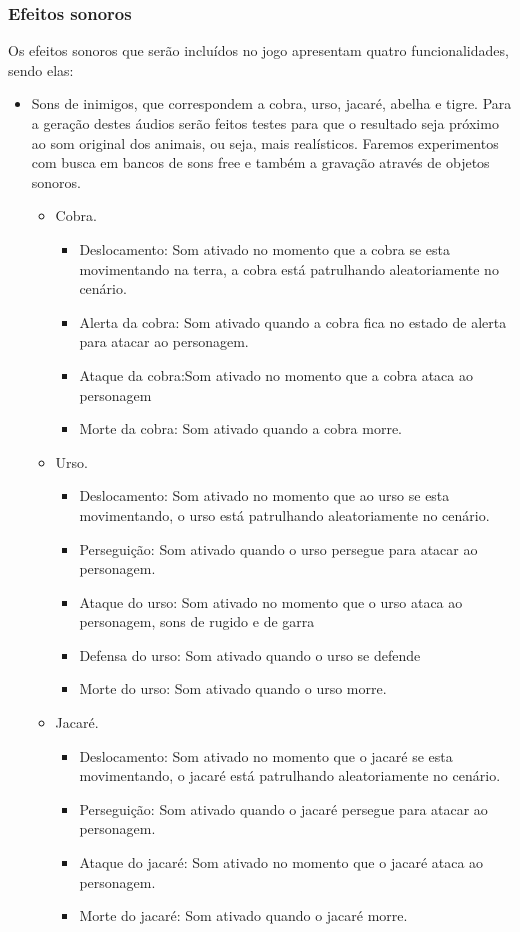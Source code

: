 \subsubsection{Efeitos sonoros}
Os efeitos sonoros que serão incluídos no jogo apresentam quatro
 funcionalidades, sendo elas:
\begin{itemize}
\item Sons de inimigos, que correspondem a cobra, urso, jacaré, abelha e tigre. 
Para a geração destes áudios serão feitos testes para que o resultado 
seja próximo ao som original dos animais, ou seja, mais realísticos. 
Faremos experimentos com busca em bancos de sons free e também a 
gravação através de objetos sonoros. 

\begin{itemize}
\item Cobra.
\begin{itemize}
\item Deslocamento: Som ativado no momento que a cobra se esta 
movimentando na terra, a cobra está patrulhando aleatoriamente no cenário.
\item Alerta da cobra: Som ativado quando a cobra fica no estado de alerta 
para atacar ao personagem.
\item Ataque da cobra:Som ativado no momento que a cobra ataca 
ao personagem 
\item Morte da cobra: Som ativado quando a cobra morre. 
\end{itemize}

\item Urso.
\begin{itemize}
\item Deslocamento: Som ativado no momento que ao urso se esta movimentando, 
o urso está patrulhando aleatoriamente no cenário.
\item Perseguição: Som ativado quando o urso persegue para atacar ao personagem.
\item Ataque do urso: Som ativado no momento que o urso ataca ao personagem, 
sons de rugido e de garra
\item Defensa do urso: Som ativado quando o urso se defende  
\item Morte do urso: Som ativado quando o urso morre.
\end{itemize}

\item Jacaré.
\begin{itemize}
\item Deslocamento: Som ativado no momento que o jacaré se esta movimentando, 
o jacaré está patrulhando aleatoriamente no cenário.
\item Perseguição: Som ativado quando o jacaré persegue para atacar ao personagem.
\item Ataque do jacaré: Som ativado no momento que o jacaré ataca ao personagem.
\item Morte do jacaré: Som ativado quando o jacaré morre.
\end{itemize}


\end{itemize}
\end{itemize}
